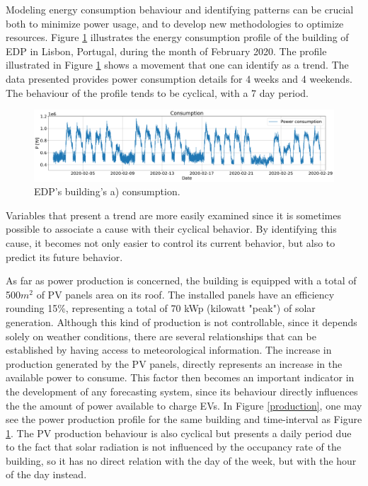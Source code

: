 Modeling energy consumption behaviour and identifying patterns can be crucial both to minimize power usage, and to develop new methodologies to optimize resources. Figure \ref{consumption} illustrates the energy consumption profile of the building of \ac{EDP} in Lisbon, Portugal, during the month of February 2020. The profile illustrated in Figure \ref{consumption} shows a movement that one can identify as a trend. The data presented provides power consumption details for 4 weeks and 4 weekends. The behaviour of the profile tends to be cyclical, with a 7 day period. 
\begin{figure}[h!]
    \centering
    \begin{center}
    \includegraphics[width=1\textwidth]{Images/power_consumption.png}
    \caption{EDP's building's a) consumption.}
    \label{consumption}
    \end{center}
\end{figure}


Variables that present a trend are more easily examined since it is sometimes possible to associate a cause with their cyclical behavior. By identifying this cause, it becomes not only easier to control its current behavior, but also to predict its future behavior. 

As far as power production is concerned, the building is equipped with a total of 500$m^2$ of \ac{PV} panels area on its roof. The installed panels have an efficiency rounding 15\%, representing a total of 70 kWp (kilowatt "peak") of solar generation. Although this kind of production is not controllable, since it depends solely on weather conditions, there are several relationships that can be established by having access to meteorological information. The increase in production generated by the \ac{PV} panels, directly represents an increase in the available power to consume. This factor then becomes an important indicator in the development of any forecasting system, since its behaviour directly influences the the amount of power available to charge \ac{EV}s. In Figure \ref{production}, one may see the power production profile for the same building and time-interval as Figure \ref{consumption}. The \ac{PV} production behaviour is also cyclical but presents a daily period due to the fact that solar radiation is not influenced by the occupancy rate of the building, so it has no direct relation with the day of the week, but with the hour of the day instead.

